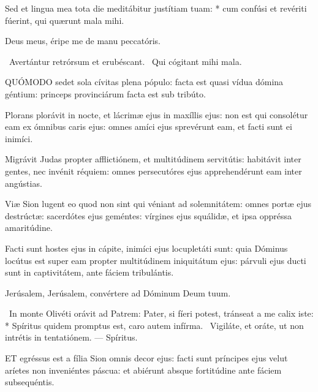 Sed et lingua mea tota die meditábitur justítiam tuam: * cum confúsi et revériti fúerint, qui quærunt mala mihi.

\rubric{\textdagger}

 Deus meus, éripe me de manu peccatóris.

\V\ Avertántur retrórsum et erubéscant. \R\ Qui cógitant mihi mala.




 \lettrine[lines=2]{Q}{UÓMODO} sedet sola cívitas plena pópulo: facta est quasi vídua dómina géntium: princeps provinciárum facta est sub tribúto.

 Plorans plorávit in nocte, et lácrimæ ejus in maxíllis ejus: non est qui consolétur eam ex ómnibus caris ejus: omnes amíci ejus sprevérunt eam, et facti sunt ei inimíci.

 Migrávit Judas propter afflictiónem, et multitúdinem servitútis: habitávit inter gentes, nec invénit réquiem: omnes persecutóres ejus apprehendérunt eam inter angústias.

 Viæ Sion lugent eo quod non sint qui véniant ad solemnitátem: omnes portæ ejus destrúctæ: sacerdótes ejus geméntes: vírgines ejus squálidæ, et ipsa oppréssa amaritúdine.

 Facti sunt hostes ejus in cápite, inimíci ejus locupletáti sunt: quia Dóminus locútus est super eam propter multitúdinem iniquitátum ejus: párvuli ejus ducti sunt in captivitátem, ante fáciem tribulántis.

Jerúsalem, Jerúsalem, convértere ad Dóminum Deum tuum.


\R\ In monte Olivéti orávit ad Patrem: Pater, si fíeri potest, tránseat a me calix iste: * Spíritus quidem promptus est, caro autem infírma. \V\ Vigiláte, et oráte, ut non intrétis in tentatiónem. --- Spíritus.


 \lettrine[lines=2]{E}{T} egréssus est a fília Sion omnis decor ejus: facti sunt príncipes ejus velut aríetes non inveniéntes páscua: et abiérunt absque fortitúdine ante fáciem subsequéntis.

